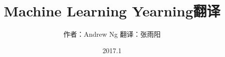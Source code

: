 \documentclass[a4paper,12pt]{book}
\begin{document}
\author{作者：Andrew Ng  翻译：张雨阳}
\title{Machine Learning Yearning翻译}
\date{2017.1}


\frontmatter
\maketitle
\tableofcontents
\mainmatter





%

\backmatter
\end{document}
